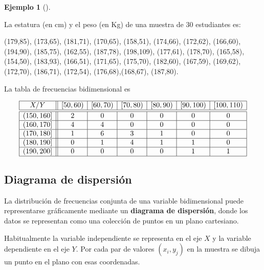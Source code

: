\documentclass[
  a4paper,
]{scrreport}
\theoremstyle{plain}
\theoremstyle{definition}
\newtheorem{example}{Ejemplo}[chapter]
\theoremstyle{definition}
\theoremstyle{remark}
\begin{document}
\begin{example}[]\protect\hypertarget{exm-datos-agrupados}{}\label{exm-datos-agrupados}

La estatura (en cm) y el peso (en Kg) de una muestra de 30 estudiantes
es:

(179,85), (173,65), (181,71), (170,65), (158,51), (174,66), (172,62),
(166,60), (194,90), (185,75), (162,55), (187,78), (198,109), (177,61),
(178,70), (165,58), (154,50), (183,93), (166,51), (171,65), (175,70),
(182,60), (167,59), (169,62), (172,70), (186,71), (172,54),
(176,68),(168,67), (187,80).

La tabla de frecuencias bidimensional es

\[\begin{array}{|c||c|c|c|c|c|c|}
\hline
  X/Y & [50,60) & [60,70) & [70,80) & [80,90) & [90,100) & [100,110) \\
  \hline\hline
  (150,160] & 2 & 0 & 0 & 0 & 0 & 0 \\
  \hline
  (160,170] & 4 & 4 & 0 & 0 & 0 & 0 \\
  \hline
  (170,180] & 1 & 6 & 3 & 1 & 0 & 0 \\
  \hline
  (180,190] & 0 & 1 & 4 & 1 & 1 & 0 \\
  \hline
  (190,200] & 0 & 0 & 0 & 0 & 1 & 1 \\
  \hline
\end{array}\]

\end{example}

\subsection{Diagrama de dispersión}\label{diagrama-de-dispersiuxf3n}

La distribución de frecuencias conjunta de una variable bidimensional
puede representarse gráficamente mediante un \textbf{diagrama de
dispersión}, donde los datos se representan como una colección de puntos
en un plano cartesiano.

Habitualmente la variable independiente se representa en el eje \(X\) y
la variable dependiente en el eje \(Y\). Por cada par de valores
\((x_i,y_j)\) en la muestra se dibuja un punto en el plano con esas
coordenadas.
\end{document}
